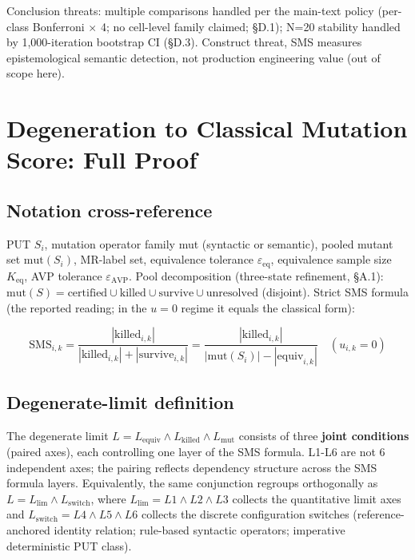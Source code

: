 \documentclass[manuscript,screen,review]{acmart}
\begin{document}
Conclusion threats: multiple comparisons handled per the main-text
policy (per-class Bonferroni $\times$ 4; no cell-level family claimed;
§D.1); N=20 stability handled by 1,000-iteration
bootstrap CI (§D.3). Construct threat, SMS measures epistemological
semantic detection, not production engineering value (out of scope here).


\section{Degeneration to Classical Mutation Score: Full Proof}\label{g.-sms-ms-degeneration-theorem-full-proof}

\subsection{Notation cross-reference}\label{g.1-notation-cross-reference-with-2.1}

PUT $S_i$, mutation operator family mut (syntactic or semantic),
pooled mutant set $\mathrm{mut}(S_i)$, MR-label set, equivalence tolerance $\varepsilon_{\mathrm{eq}}$, equivalence
sample size $K_{\mathrm{eq}}$, AVP tolerance $\varepsilon_{\mathrm{AVP}}$. Pool
decomposition (three-state refinement, §A.1):
$\mathrm{mut}(S) = \mathrm{certified} \cup \mathrm{killed} \cup \mathrm{survive} \cup \mathrm{unresolved}$
(disjoint). Strict SMS formula (the reported reading; in the
$u = 0$ regime it equals the classical form):

\[
\mathrm{SMS}_{i,k} = \frac{|\mathrm{killed}_{i,k}|}{|\mathrm{killed}_{i,k}| + |\mathrm{survive}_{i,k}|}
= \frac{|\mathrm{killed}_{i,k}|}{|\mathrm{mut}(S_i)| - |\mathrm{equiv}_{i,k}|} \quad (u_{i,k} = 0)
\]

\subsection{Degenerate-limit definition}\label{g.2-degenerate-limit-definition-r-8-p1-3-revision-3-joint-conditions}

The degenerate limit $L = L_{\mathrm{equiv}} \wedge L_{\mathrm{killed}} \wedge L_{\mathrm{mut}}$
consists of three \textbf{joint conditions} (paired axes), each
controlling one layer of the SMS formula. L1-L6 are not 6 independent
axes; the pairing reflects dependency structure across the SMS formula
layers. Equivalently, the same conjunction regroups orthogonally as
$L = L_{\mathrm{lim}} \wedge L_{\mathrm{switch}}$, where
$L_{\mathrm{lim}} = L1 \wedge L2 \wedge L3$ collects the quantitative
limit axes and $L_{\mathrm{switch}} = L4 \wedge L5 \wedge L6$ collects
the discrete configuration switches (reference-anchored identity
relation; rule-based syntactic operators; imperative deterministic PUT
class).
\end{document}
